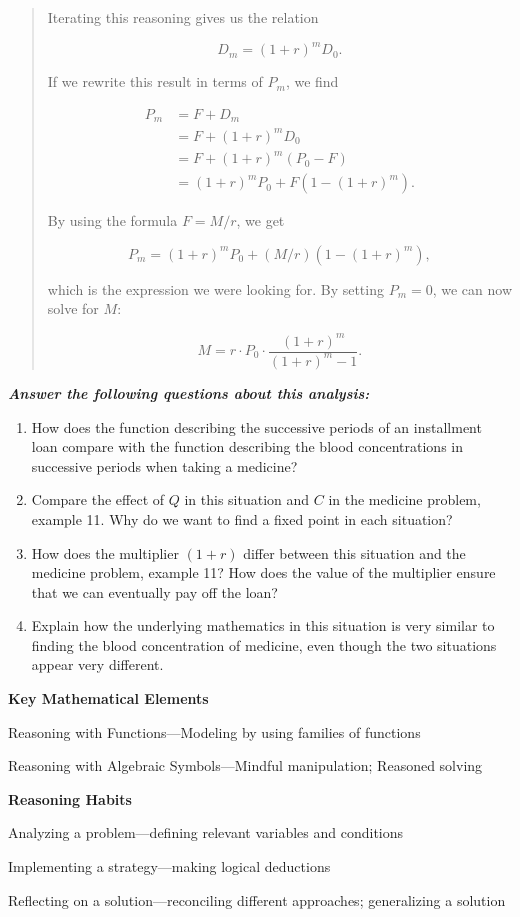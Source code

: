 \documentclass[
  10pt,
  a4paper,
  landscape,
  twoside,
  openany
]{scrbook}
\newcounter{example}
\begin{document}
{\begin{quotation}
  Iterating this reasoning gives us the relation

  $$
    D_m = (1 + r)^m D_0.
  $$

  If we rewrite this result in terms of $P_m$, we find

  \begin{align*}
    P_m
      &=F+D_m \\
      &=F+(1+r)^mD_0 \\
      &=F+(1+r)^m(P_0-F) \\
      &=(1+r)^mP_0+F\left(1-(1+r)^m\right).
  \end{align*}

  By using the formula $F = M/r$, we get

  $$
    P_m=(1+r)^mP_0+(M/r)\left(1-(1+r)^m\right),
  $$

  which is the expression we were looking for. By setting $P_m = 0$, we can now solve for $M$:

  $$
    M=r\cdot P_0\cdot \frac{(1+r)^m}{(1+r)^m-1}.
  $$
\end{quotation}

\noindent
\textbf{\emph{Answer the following questions about this analysis:}}

\begin{enumerate}
  \item How does the function describing the successive periods of an installment loan compare with the function describing the blood concentrations in successive periods when taking a medicine?
  \item Compare the effect of $Q$ in this situation and $C$ in the medicine problem, example 11. Why do we want to find a fixed point in each situation?
  \item How does the multiplier $(1 + r)$ differ between this situation and the medicine problem, example 11? How does the value of the multiplier ensure that we can eventually pay off the loan?
  \item Explain how the underlying mathematics in this situation is very similar to finding the blood concentration of medicine, even though the two situations appear very different. 
\end{enumerate}

\noindent
\textbf{Key Mathematical Elements}

Reasoning with Functions---Modeling by using families of functions

Reasoning with Algebraic Symbols---Mindful manipulation; Reasoned solving

\noindent
\textbf{Reasoning Habits}

Analyzing a problem---defining relevant variables and conditions

Implementing a strategy---making logical deductions

Reflecting on a solution---reconciling different approaches; generalizing a solution
}
\end{document}
